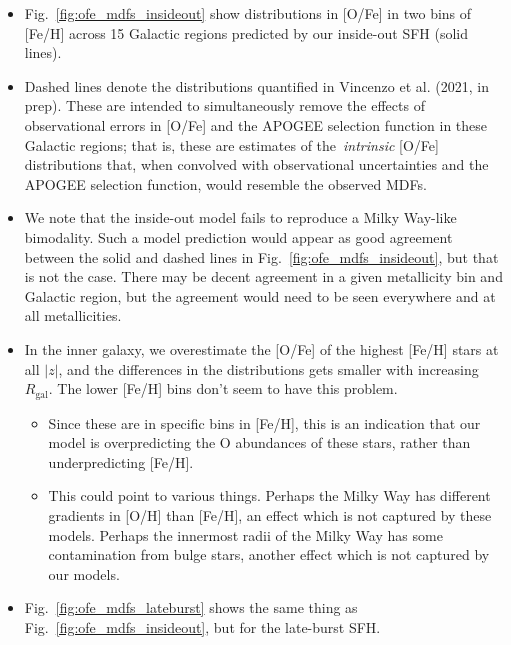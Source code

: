 \documentclass[a4paper, fleqn, usenatbib, useAMS]{mnras}
\begin{document}
\begin{itemize} 
	\item Fig.~\ref{fig:ofe_mdfs_insideout} show distributions in [O/Fe] in two 
	bins of [Fe/H] across 15 Galactic regions predicted by our inside-out SFH 
	(solid lines). 

	\item Dashed lines denote the distributions quantified in Vincenzo et al. 
	(2021, in prep). These are intended to simultaneously remove the effects of 
	observational errors in [O/Fe] and the APOGEE selection function in these 
	Galactic regions; that is, these are estimates of the~\textit{intrinsic} 
	[O/Fe] distributions that, when convolved with observational uncertainties 
	and the APOGEE selection function, would resemble the observed MDFs. 

	\item We note that the inside-out model fails to reproduce a Milky Way-like 
	bimodality. Such a model prediction would appear as good agreement between 
	the solid and dashed lines in Fig.~\ref{fig:ofe_mdfs_insideout}, but that 
	is not the case. There may be decent agreement in a given metallicity bin 
	and Galactic region, but the agreement would need to be seen everywhere and 
	at all metallicities. 

	\item In the inner galaxy, we overestimate the [O/Fe] of the highest [Fe/H] 
	stars at all $\left|z\right|$, and the differences in the distributions 
	gets smaller with increasing~$R_\text{gal}$. The lower [Fe/H] bins don't 
	seem to have this problem. 
	\begin{itemize} 
		\item Since these are in specific bins in [Fe/H], this is an indication 
		that our model is overpredicting the O abundances of these stars, 
		rather than underpredicting [Fe/H]. 

		\item This could point to various things. Perhaps the Milky Way has 
		different gradients in [O/H] than [Fe/H], an effect which is not 
		captured by these models. Perhaps the innermost radii of the Milky Way 
		has some contamination from bulge stars, another effect which is not 
		captured by our models. 
	\end{itemize} 

	\item Fig.~\ref{fig:ofe_mdfs_lateburst} shows the same thing as 
	Fig.~\ref{fig:ofe_mdfs_insideout}, but for the late-burst SFH. 


\end{itemize}
\end{document}
